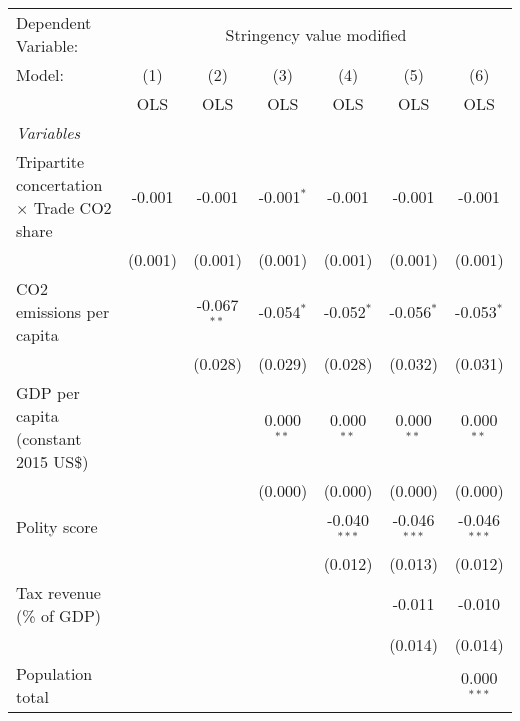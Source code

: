 
\begingroup
\centering
\begin{tabular}{lcccccc}
   \toprule
   Dependent Variable: & \multicolumn{6}{c}{Stringency value modified}\\
   Model:                                            & (1)     & (2)           & (3)          & (4)            & (5)            & (6)\\  
                                                     &  OLS    & OLS           & OLS          & OLS            & OLS            & OLS\\  
   \midrule
   \emph{Variables}\\
   Tripartite concertation $\times$ Trade CO2 share  & -0.001  & -0.001        & -0.001$^{*}$ & -0.001         & -0.001         & -0.001\\   
                                                     & (0.001) & (0.001)       & (0.001)      & (0.001)        & (0.001)        & (0.001)\\   
   CO2 emissions per capita                          &         & -0.067$^{**}$ & -0.054$^{*}$ & -0.052$^{*}$   & -0.056$^{*}$   & -0.053$^{*}$\\   
                                                     &         & (0.028)       & (0.029)      & (0.028)        & (0.032)        & (0.031)\\   
   GDP per capita (constant 2015 US\$)               &         &               & 0.000$^{**}$ & 0.000$^{**}$   & 0.000$^{**}$   & 0.000$^{**}$\\   
                                                     &         &               & (0.000)      & (0.000)        & (0.000)        & (0.000)\\   
   Polity score                                      &         &               &              & -0.040$^{***}$ & -0.046$^{***}$ & -0.046$^{***}$\\   
                                                     &         &               &              & (0.012)        & (0.013)        & (0.012)\\   
   Tax revenue (\% of GDP)                           &         &               &              &                & -0.011         & -0.010\\   
                                                     &         &               &              &                & (0.014)        & (0.014)\\   
   Population total                                  &         &               &              &                &                & 0.000$^{***}$\\   

\end{tabular}
